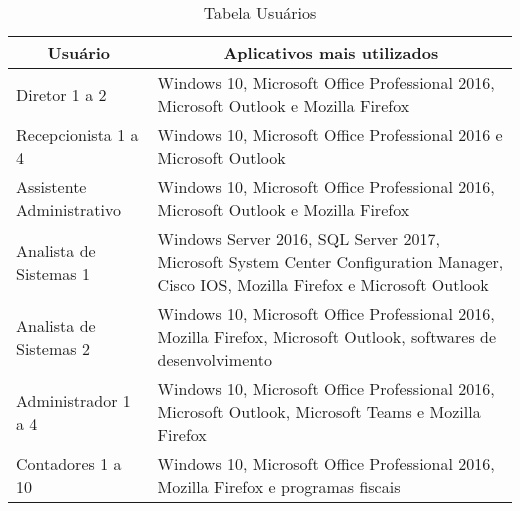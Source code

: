 \begin{table}[h!]
	\centering
	\begin{tabular}{|p{5cm}|p{11cm}|}
		\hline
		\multicolumn{1}{|c|}{\textbf{Usuário}} & \multicolumn{1}{c|}{\textbf{Aplicativos mais utilizados}}                                                                           \\ \hline
		Diretor 1 a 2 & Windows 10, Microsoft Office Professional 2016, Microsoft Outlook e Mozilla Firefox 
		\\ \hline
		Recepcionista 1 a 4 & Windows 10, Microsoft Office Professional 2016 e Microsoft Outlook                                                               \\ \hline
		Assistente Administrativo & Windows 10, Microsoft Office Professional 2016, Microsoft Outlook e Mozilla Firefox 
		\\ \hline
		Analista de Sistemas 1 & Windows Server 2016, SQL Server 2017, Microsoft System Center Configuration Manager, Cisco IOS, Mozilla Firefox e Microsoft Outlook 
		\\ \hline
		Analista de Sistemas 2 & Windows 10, Microsoft Office Professional 2016, Mozilla Firefox, Microsoft Outlook, softwares de desenvolvimento                    
		\\ \hline
		Administrador 1 a 4 & Windows 10, Microsoft Office Professional 2016, Microsoft Outlook, Microsoft Teams e Mozilla Firefox 
		\\ \hline
		Contadores 1 a 10 & Windows 10, Microsoft Office Professional 2016, Mozilla Firefox e programas fiscais 
		\\ \hline
	\end{tabular}
	\caption{Tabela Usuários}
	\label{tab:usuarios}
\end{table}


